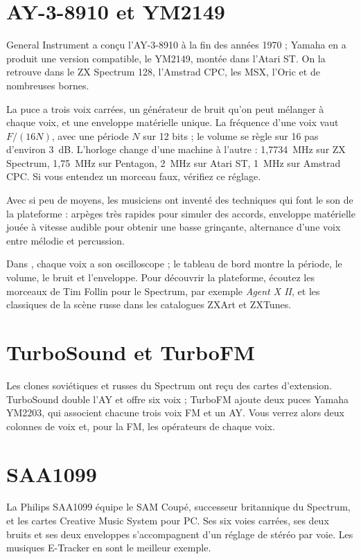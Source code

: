 \section{AY-3-8910 et YM2149}
General Instrument a conçu l'AY-3-8910 à la fin des années 1970 ; Yamaha en a produit une version compatible, le
YM2149, montée dans l'Atari ST. On la retrouve dans le ZX Spectrum 128, l'Amstrad CPC, les MSX, l'Oric et de
nombreuses bornes.

La puce a trois voix carrées, un générateur de bruit qu'on peut mélanger à chaque voix, et une enveloppe matérielle
unique. La fréquence d'une voix vaut $F/(16N)$, avec une période $N$ sur 12 bits ; le volume se règle sur 16 pas
d'environ 3~dB. L'horloge change d'une machine à l'autre : 1,7734~MHz sur ZX Spectrum, 1,75~MHz sur Pentagon,
2~MHz sur Atari ST, 1~MHz sur Amstrad CPC. Si vous entendez un morceau faux, vérifiez ce réglage.

Avec si peu de moyens, les musiciens ont inventé des techniques qui font le son de la plateforme : arpèges très
rapides pour simuler des accords, enveloppe matérielle jouée à vitesse audible pour obtenir une basse grinçante,
alternance d'une voix entre mélodie et percussion.

Dans \soft, chaque voix a son oscilloscope ; le tableau de bord montre la période, le volume, le bruit et
l'enveloppe. Pour découvrir la plateforme, écoutez les morceaux de Tim Follin pour le Spectrum, par exemple
\emph{Agent X II}, et les classiques de la scène russe dans les catalogues ZXArt et ZXTunes.

\section{TurboSound et TurboFM}
Les clones soviétiques et russes du Spectrum ont reçu des cartes d'extension. TurboSound double l'AY et offre six
voix ; TurboFM ajoute deux puces Yamaha YM2203, qui associent chacune trois voix FM et un AY. Vous verrez alors deux
colonnes de voix et, pour la FM, les opérateurs de chaque voix.

\section{SAA1099}
La Philips SAA1099 équipe le SAM Coupé, successeur britannique du Spectrum, et les cartes Creative Music System
pour PC. Ses six voies carrées, ses deux bruits et ses deux enveloppes s'accompagnent d'un réglage de stéréo par
voie. Les musiques E-Tracker en sont le meilleur exemple.

